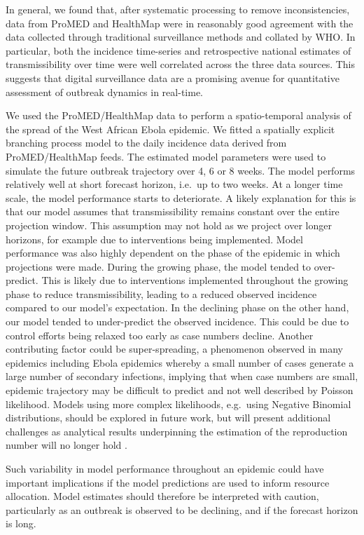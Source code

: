 \documentclass[9pt,twocolumn,twoside,lineno]{pnas-new}
\begin{document}
In general, we found that, after systematic processing to remove
inconsistencies, data from ProMED and HealthMap were in
reasonably good agreement
with the data collected through traditional surveillance methods and collated by WHO.
In particular, both the incidence time-series and retrospective national
estimates of transmissibility over time were well correlated across the
three data sources. This suggests that digital surveillance data are a
promising avenue for quantitative assessment of
outbreak dynamics in real-time. 

We used the ProMED/HealthMap data to perform a spatio-temporal analysis
of the spread of the West African Ebola epidemic. We fitted a spatially
explicit branching process model to the daily incidence data derived
from ProMED/HealthMap feeds. The estimated model parameters were used to
simulate the future outbreak trajectory over 4, 6 or 8 weeks. The model
performs relatively well at short forecast horizon, i.e.~up to
two weeks. At a
longer time scale, the model performance starts to deteriorate. A likely
explanation for this is that our model assumes that transmissibility
remains constant over the entire projection window. This assumption may
not hold as we project over longer horizons, for example due to
interventions being implemented. Model performance was also highly
dependent on the phase of the epidemic in which projections were made.
During the growing phase, the model tended to over-predict. This is
likely due to interventions implemented throughout the growing phase to
reduce transmissibility, leading to a reduced observed incidence
compared to our model's expectation. In the declining phase on the other
hand, our model tended to under-predict the observed incidence. This
could be due to control efforts being relaxed too early as case
numbers decline. Another contributing factor could be super-spreading,
a phenomenon observed in many
epidemics including Ebola epidemics \cite{lau2017spatial,
  agua2016exposure}
whereby a small number of cases generate a large
number of secondary infections, implying that when case numbers are
small, epidemic trajectory may be difficult to predict and not well
described by Poisson likelihood. Models using more complex likelihoods,
e.g.~using Negative Binomial distributions, should be explored in future
work, but will present additional challenges as analytical results
underpinning the estimation of the reproduction number will no longer
hold \cite{cori2013new}.

Such variability in model performance throughout an epidemic could have
important implications if the model predictions are used to inform
resource allocation. Model estimates should therefore be interpreted
with caution, particularly as an outbreak is observed to be declining,
and if the forecast horizon is long.
\end{document}
